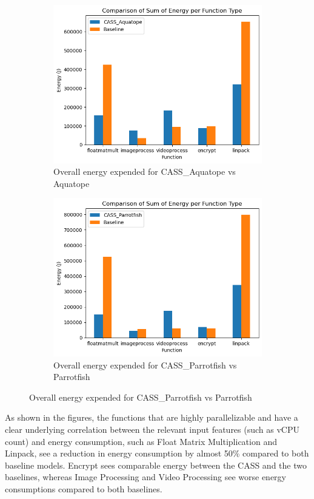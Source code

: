\documentclass[times, 10pt,twocolumn]{article}
\begin{document}
\begin{figure}[H] %
   \centering
   \begin{subfigure}[b]{0.5\textwidth} %
         \centering
         \includegraphics[width=0.6\linewidth]{imgs/final_experiment_plots/energy_comparison/aquatope/overall.png}
         \caption{Overall energy expended for CASS\_Aquatope vs Aquatope}
         \label{fig:cassvsaquatope_energy}
   \end{subfigure}
   \begin{subfigure}[b]{0.5\textwidth} %
         \centering
         \includegraphics[width=0.6\linewidth]{imgs/final_experiment_plots/energy_comparison/parrotfish/overall.png}
         \caption{Overall energy expended for CASS\_Parrotfish vs Parrotfish}
         \label{fig:cassvsparrotfish_energy}
   \end{subfigure}
   \end{figure}

As shown in the figures, the functions that are highly parallelizable and have a clear underlying correlation between the relevant input features (such as vCPU count) and energy consumption, such as Float Matrix Multiplication and Linpack, see a reduction in energy consumption by almost 50\% compared to both baseline models. Encrypt sees comparable energy between the CASS and the two baselines, whereas Image Processing and Video Processing see worse energy consumptions compared to both baselines.
\end{document}
